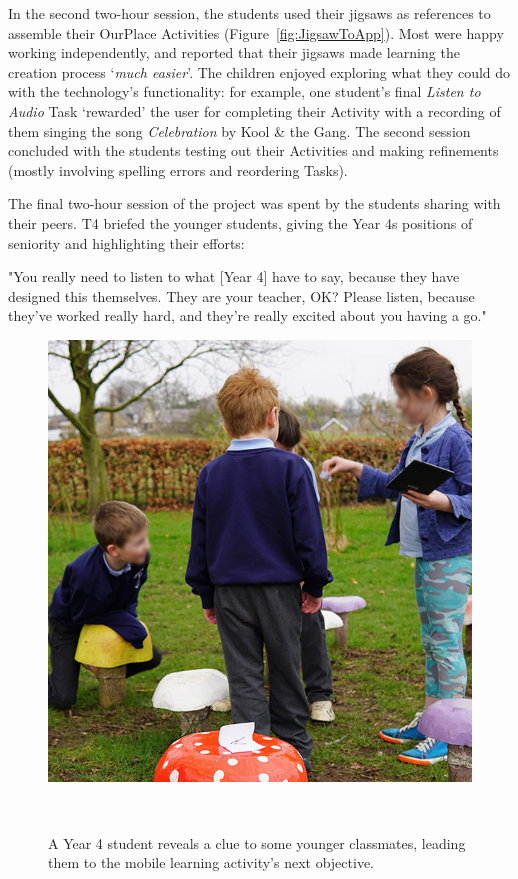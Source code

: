 In the second two-hour session, the students used their jigsaws as references to assemble their OurPlace Activities (Figure~\ref{fig:JigsawToApp}). Most were happy working independently, and reported that their jigsaws made learning the creation process `\textit{much easier}'. The children enjoyed exploring what they could do with the technology's functionality: for example, one student's final \textit{Listen to Audio} Task `rewarded' the user for completing their Activity with a recording of them singing the song \textit{Celebration} by Kool \& the Gang. The second session concluded with the students testing out their Activities and making refinements (mostly involving spelling errors and reordering Tasks). 

The final two-hour session of the project was spent by the students sharing with their peers. T4 briefed the younger students, giving the Year 4s positions of seniority and highlighting their efforts:

\begin{displayquote}
"You really need to listen to what [Year 4] have to say, because they have designed this themselves. They are your teacher, OK? Please listen, because they've worked really hard, and they're really excited about you having a go."
\end{displayquote}

\begin{figure}
\centering
  \includegraphics[width=0.66\columnwidth]{images/chapter08/mushrooms.jpg}
  \caption[Year 4 students using OurPlace]{A Year 4 student reveals a clue to some younger classmates, leading them to the mobile learning activity's next objective. }~\label{fig:Mushrooms}
\end{figure}

